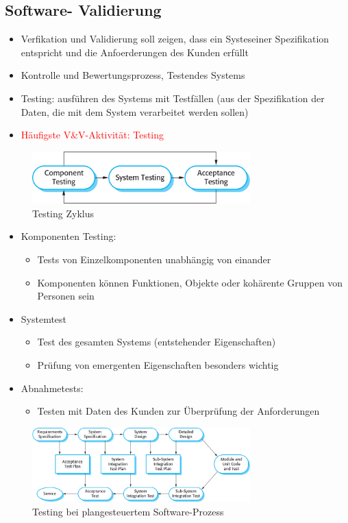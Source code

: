 \subsection{Software- Validierung}
\begin{itemize}
    \item Verfikation und Validierung soll zeigen, dass ein Systeseiner Spezifikation entspricht und die Anfoerderungen des Kunden erfüllt
    \item Kontrolle und Bewertungsprozess, Testendes Systems 
    \item Testing: ausführen des Systems mit Testfällen (aus der Spezifikation der Daten, die mit dem System verarbeitet werden sollen)
    \item \textcolor{red}{Häufigste V\&V-Aktivität: Testing}
\end{itemize}
\begin{figure}[h]
  \centering
     \includegraphics[width=0.75\textwidth]{mainmatter/pics/vandv.png}
  \caption{Testing Zyklus}
\end{figure}
\begin{itemize}
    \item Komponenten Testing:
    \begin{itemize}
        \item Tests von Einzelkomponenten unabhängig von einander
        \item Komponenten können Funktionen, Objekte oder kohärente Gruppen von Personen sein
    \end{itemize}
    \item Systemtest
    \begin{itemize}
        \item Test des gesamten Systems (entstehender Eigenschaften)
        \item Prüfung von emergenten Eigenschaften besonders wichtig
    \end{itemize}
    \item Abnahmetests:
    \begin{itemize}
        \item Testen mit Daten des Kunden zur Überprüfung der Anforderungen
    \end{itemize}
\end{itemize}
\begin{figure}[h]
  \centering
     \includegraphics[width=0.75\textwidth]{mainmatter/pics/validation.png}
  \caption{Testing bei plangesteuertem Software-Prozess}
\end{figure}

